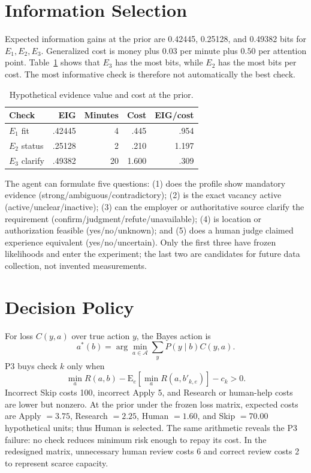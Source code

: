\documentclass{article}
\begin{document}
\section{Information Selection}
Expected information gains at the prior are 0.42445, 0.25128, and 0.49382 bits for $E_1,E_2,E_3$. Generalized cost is money plus $0.03$ per minute plus $0.50$ per attention point. Table~\ref{tab:information} shows that $E_3$ has the most bits, while $E_2$ has the most bits per cost. The most informative check is therefore not automatically the best check.

\begin{table}[t]
\centering\small
\caption{Hypothetical evidence value and cost at the prior.}
\label{tab:information}
\begin{tabular}{lrrrr}
\toprule
Check&EIG&Minutes&Cost&EIG/cost\\
\midrule
$E_1$ fit&.42445&4&.445&.954\\
$E_2$ status&.25128&2&.210&1.197\\
$E_3$ clarify&.49382&20&1.600&.309\\
\bottomrule
\end{tabular}
\end{table}

The agent can formulate five questions: (1) does the profile show mandatory evidence (strong/ambiguous/contradictory); (2) is the exact vacancy active (active/unclear/inactive); (3) can the employer or authoritative source clarify the requirement (confirm/judgment/refute/unavailable); (4) is location or authorization feasible (yes/no/unknown); and (5) does a human judge claimed experience equivalent (yes/no/uncertain). Only the first three have frozen likelihoods and enter the experiment; the last two are candidates for future data collection, not invented measurements.

\section{Decision Policy}

For loss $C(y,a)$ over true action $y$, the Bayes action is
\begin{equation}
a^*(b)=\arg\min_{a\in\mathcal A}\sum_y P(y\mid b)C(y,a).
\end{equation}
P3 buys check $k$ only when
\begin{equation}
\min_a R(a,b)-\mathrm{E}_e[\min_a R(a,b'_{k,e})]-c_k>0.
\end{equation}
Incorrect Skip costs 100, incorrect Apply 5, and Research or human-help costs are lower but nonzero. At the prior under the frozen loss matrix, expected costs are Apply $=3.75$, Research $=2.25$, Human $=1.60$, and Skip $=70.00$ hypothetical units; thus Human is selected. The same arithmetic reveals the P3 failure: no check reduces minimum risk enough to repay its cost. In the redesigned matrix, unnecessary human review costs 6 and correct review costs 2 to represent scarce capacity.
\end{document}
